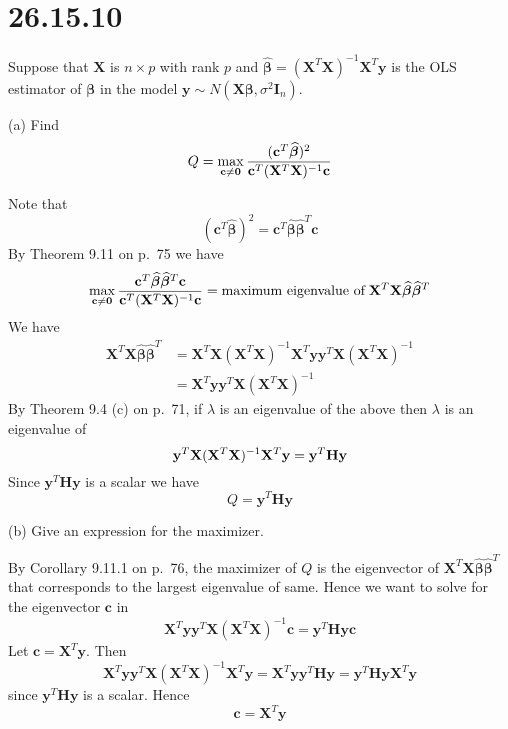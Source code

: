 \section*{26.15.10}
Suppose that $\mathbf X$ is $n\times p$ with rank $p$ and
$\bm{\widehat\beta}=(\mathbf X^T\mathbf X)^{-1}\mathbf X^T
\mathbf y$ is the OLS estimator of $\bm\beta$ in the model
$\mathbf y\sim N(\mathbf X\bm\beta,\sigma^2\mathbf I_n)$.

\bigskip
\noindent
(a) Find
\[
Q=\max_{\mathbf c\ne\mathbf0}
{(\mathbf c^T\bm{\widehat\beta})^2
\over\mathbf c^T(\mathbf X^T\mathbf X)^{-1}\mathbf c}
\]

\bigskip
\noindent
Note that
\[
(\mathbf c^T\bm{\widehat\beta})^2
=\mathbf c^T\bm{\widehat\beta}\bm{\widehat\beta}^T\mathbf c
\]
By Theorem 9.11 on p.\ 75 we have
\[
\max_{\mathbf c\ne\mathbf0}
{\mathbf c^T\bm{\widehat\beta}\bm{\widehat\beta}^T\mathbf c
\over\mathbf c^T(\mathbf X^T\mathbf X)^{-1}\mathbf c}
=\hbox{maximum eigenvalue of}\;
\mathbf X^T\mathbf X\bm{\widehat\beta}\bm{\widehat\beta}^T
\]
We have
\begin{align*}
\mathbf X^T\mathbf X\bm{\widehat\beta}\bm{\widehat\beta}^T
&=
\mathbf X^T\mathbf X(\mathbf X^T\mathbf X)^{-1}
\mathbf X^T\mathbf y\mathbf y^T\mathbf X(\mathbf X^T\mathbf X)^{-1}\\
&=
\mathbf X^T\mathbf y\mathbf y^T\mathbf X(\mathbf X^T\mathbf X)^{-1}
\end{align*}
%
By Theorem 9.4 (c) on p.\ 71, if $\lambda$ is an eigenvalue of
the above then $\lambda$ is an eigenvalue of
\[
\mathbf y^T\mathbf X(\mathbf X^T\mathbf X)^{-1}\mathbf X^T\mathbf y\\
=
\mathbf y^T\mathbf H\mathbf y
\]
Since $\mathbf y^T\mathbf{Hy}$ is a scalar we have
\[
Q=\mathbf y^T\mathbf{Hy}
\]

\bigskip
\noindent
(b) Give an expression for the maximizer.

\bigskip
\noindent
By Corollary 9.11.1 on p.\ 76, the maximizer of $Q$ is the eigenvector
of $\mathbf X^T\mathbf X\bm{\widehat\beta}\bm{\widehat\beta}^T$
that corresponds to the largest eigenvalue of same.
Hence we want to solve for the eigenvector $\mathbf c$ in
\[
\mathbf X^T\mathbf y\mathbf y^T\mathbf X(\mathbf X^T\mathbf X)^{-1}
\mathbf c
=\mathbf y^T\mathbf{Hyc}
\]
Let $\mathbf c=\mathbf X^T\mathbf y$. Then
\[
\mathbf X^T\mathbf y\mathbf y^T\mathbf X(\mathbf X^T\mathbf X)^{-1}
\mathbf X^T\mathbf y
=
\mathbf X^T\mathbf y\mathbf y^T\mathbf{Hy}
=
\mathbf y^T\mathbf{HyX}^T\mathbf y
\]
since $\mathbf y^T\mathbf{Hy}$ is a scalar. Hence
\[
\mathbf c=\mathbf X^T\mathbf y
\]

